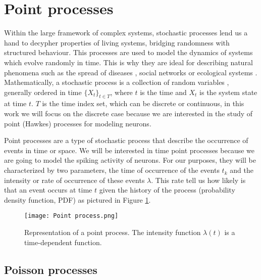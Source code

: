 \section{Point processes} \label{sec:point_processes}
Within the large framework of complex systems, stochastic processes lend us a hand to decypher properties of living systems, bridging randomness with structured behaviour.
This processes are used to model the dynamics of systems which evolve randomly in time. This is why they are ideal for describing natural phenomena such as 
the spread of diseases \cite{Chowell}, social networks \cite{castellano2009statistical} or ecological systems \cite{azaele2016statistical}. Mathematically, a stochastic process
is a collection of random variables \cite{McKane}, generally ordered in time $ \{X_t\}_{t \in T} $, where $t$ is the time and $X_t$ is the system state at time $t$. $T$ is the time index set, 
which can be discrete or continuous, in this work we will focus on the discrete case because we are interested in the study of point (Hawkes) processes for modeling neurons. 

Point processes are a type of stochastic process that describe the occurrence of events in time or space. We will be interested in time point processes because 
we are going to model the spiking activity of neurons. For our purposes, they will be characterized by two parameters, the time of occurrence
of the events $t_k$ and the intensity or rate of occurrence of these events $\lambda$. This rate tell us how likely is that an event occurs at time $t$ given the history of the process 
(probability density function, PDF) as pictured in Figure \ref{f:point_process}.

\begin{figure}[H]
    \centering
    \texttt{[image: Point process.png]}
    \caption{Representation of a point process. The intensity function $\lambda(t)$ is a time-dependent function.}
    \label{f:point_process}
\end{figure}

\subsection{Poisson processes} \label{subsec:Poisson_processes}

